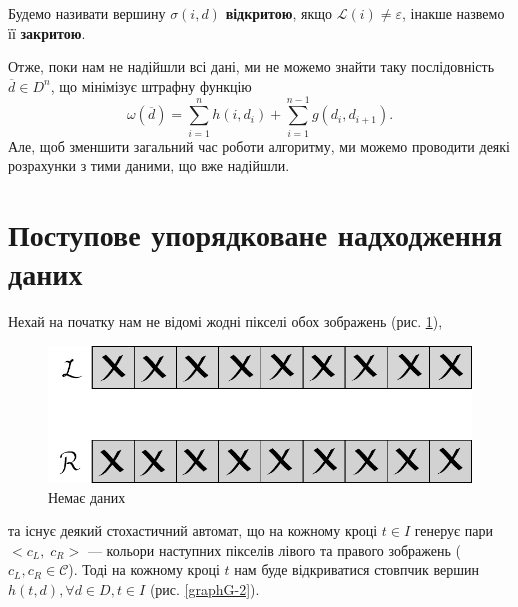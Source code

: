 Будемо називати вершину $\sigma(i, d)$ \textbf{відкритою}, якщо $ \mathcal{L}(i) \neq \varepsilon$, інакше назвемо її \textbf{закритою}.

Отже, поки нам не надійшли всі дані, ми не можемо знайти таку послідовність $\overline{d} \in {D}^n$, що мінімізує штрафну функцію
$$\omega(\overline{d}) = \sum\limits_{i = 1}^n h(i, d_i) + \sum\limits_{i = 1}^{n-1} g(d_i, d_{i + 1}).$$ 
Але, щоб зменшити загальний час роботи алгоритму, ми можемо проводити деякі розрахунки з тими даними, що вже надійшли.



\section{Поступове упорядковане надходження даних}
Нехай на початку нам не відомі жодні пікселі обох зображень (рис. \ref{2.1nodata}),
\begin{figure}[h!]
	\centering
	\includegraphics[scale = 0.8]{allclosed2.pdf}
	\caption{Немає даних}
	\label{2.1nodata}
\end{figure}
та існує деякий стохастичний автомат, що на кожному кроці $ t \in I $ генерує пари $<c_L, \;c_R>$ --- кольори наступних пікселів лівого та правого зображень ($ c_L, c_R \in \mathcal{C} $).
Тоді на кожному кроці $ t $ нам буде відкриватися стовпчик вершин $  h(t, d), \forall d \in D, t \in I $ (рис. \ref{graphG-2}).
